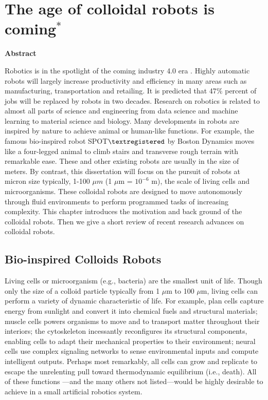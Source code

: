 \chapter{The age of colloidal robots is coming$^{*}$}
\begin{center}
\vspace*{1\baselineskip}
\textbf{Abstract}
\end{center}
Robotics is in the spotlight of the coming industry 4.0 era \autocite{lasi2014industry}. Highly automatic robots will largely increase productivity and efficiency in many areas such as manufacturing, transportation and retailing. 
It is predicted that 47$\%$ percent of jobs will be replaced by robots in two decades\autocite{frey2017future}.
Research on robotics is related to almost all parts of science and engineering from data science and machine learning to material science and biology. Many developments in robots are inspired by nature to achieve animal or human-like functions. For example,  the famous  bio-inspired robot SPOT$\textregistered$  by Boston Dynamics \autocite{yang2019ten} moves like a four-legged animal to climb stairs and transverse rough terrain with remarkable ease. These and other existing robots are usually in the size of meters. By contrast, this dissertation will focus on the pursuit of robots at micron size typically, 1-100 $\mu m$ (1 $\mu$m = $10^{-6}$ m), the scale of living cells and microorganisms. These colloidal robots are designed to move autonomously through fluid environments to perform programmed tasks of increasing complexity. This chapter introduces the motivation and back ground of the colloidal robots. Then we give a short review of recent research advances on colloidal robots.

\section{Bio-inspired Colloids Robots}
Living cells or microorganism (e.g., bacteria) are the smallest unit of life. Though  only the size of a colloid particle typically from 1 $\mu$m to 100 $\mu$m, living cells can perform  a variety of dynamic characteristic of life. For example, plan cells capture energy from sunlight and convert it into chemical fuels and structural materials; muscle cells powers organisms to move and to transport matter throughout their interiors; the cytoskeleton incessantly reconfigures its structural components, enabling cells to adapt their mechanical properties to their environment; neural cells use complex signaling networks to sense environmental inputs and compute intelligent outputs. Perhaps most remarkably, all cells can grow and replicate to escape the unrelenting pull toward thermodynamic equilibrium (i.e., death).  All of these functions ---and the many others not listed---would be highly desirable to achieve in a small artificial robotics system. 

